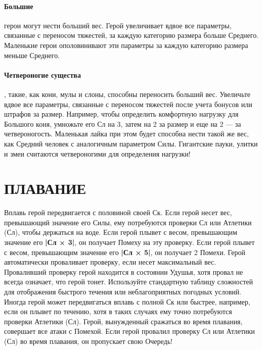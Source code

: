 \paragraph{Большие} герои могут нести больший вес. Герой увеличивает вдвое все параметры, связанные с переносом тяжестей, за каждую категорию размера больше Среднего. Маленькие герои ополовинивают эти параметры за каждую категорию размера меньше Среднего.
\paragraph{Четвероногие существа}, такие, как кони, мулы и слоны, способны переносить больший вес. Увеличьте вдвое все параметры, связанные с переносом тяжестей после учета бонусов или штрафов за размер. Например, чтобы определить комфортную нагрузку для Большого коня, умножьте его Сл на 3, затем на 2 за размер и еще на 2 — за четвероногость. Маленькая лайка при этом будет способна нести такой же вес, как Средний человек с аналогичным параметром Силы. Гигантские пауки, улитки и змеи считаются четвероногими для определения нагрузки!
\section{ПЛАВАНИЕ}
Вплавь герой передвигается с половиной своей Ск. Если герой несет вес, превышающий значение его Силы, ему потребуются проверки Сл или Атлетики (Сл), чтобы держаться на воде. Если герой плывет с весом, превышающим значение его \textbf{|Сл × 3|}, он получает Помеху на эту проверку. Если герой плывет с весом, превышающим значение его \textbf{|Сл × 5|}, он получает 2 Помехи. Герой автоматически проваливает проверку, если несет максимальный вес. Проваливший проверку герой находится в состоянии Удушья, хотя провал не всегда означает, что герой тонет. Используйте стандартную таблицу сложностей для отображения быстрого течения или неблагоприятных погодных условий. Иногда герой может передвигаться вплавь с полной Ск или быстрее, например, если он плывет по течению, хотя в таких случаях ему точно потребуются проверки Атлетики (Сл).
\newline
Герой, вынужденный сражаться во время плавания, совершает все атаки с Помехой. Если герой провалил проверку Сл или Атлетики (Сл) во время плавания, он пропускает свою Очередь!
